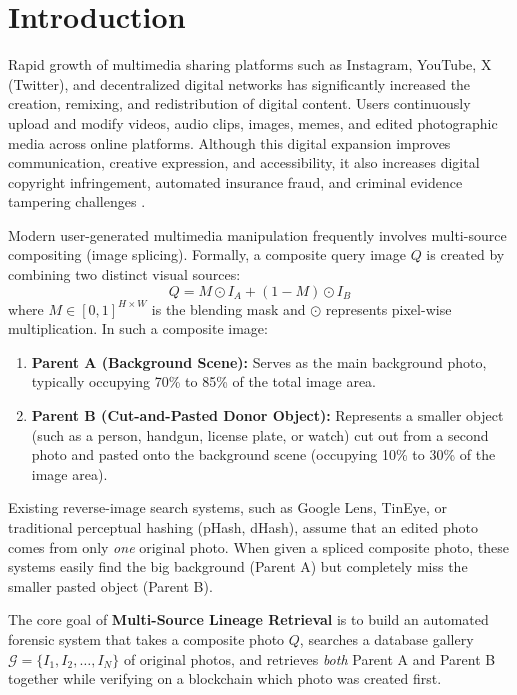\documentclass[12pt,a4paper]{article}
\begin{document}
\section{Introduction}
Rapid growth of multimedia sharing platforms such as Instagram, YouTube, X (Twitter), and decentralized digital networks has significantly increased the creation, remixing, and redistribution of digital content. Users continuously upload and modify videos, audio clips, images, memes, and edited photographic media across online platforms. Although this digital expansion improves communication, creative expression, and accessibility, it also increases digital copyright infringement, automated insurance fraud, and criminal evidence tampering challenges \cite{sscd, trufor}.

Modern user-generated multimedia manipulation frequently involves multi-source compositing (image splicing). Formally, a composite query image $Q$ is created by combining two distinct visual sources:
\begin{equation}
Q = M \odot I_A + (1 - M) \odot I_B
\end{equation}
where $M \in [0, 1]^{H \times W}$ is the blending mask and $\odot$ represents pixel-wise multiplication. In such a composite image:
\begin{enumerate}
    \item \textbf{Parent A (Background Scene):} Serves as the main background photo, typically occupying 70\% to 85\% of the total image area.
    \item \textbf{Parent B (Cut-and-Pasted Donor Object):} Represents a smaller object (such as a person, handgun, license plate, or watch) cut out from a second photo and pasted onto the background scene (occupying 10\% to 30\% of the image area).
\end{enumerate}

Existing reverse-image search systems, such as Google Lens, TinEye, or traditional perceptual hashing (pHash, dHash), assume that an edited photo comes from only \textit{one} original photo. When given a spliced composite photo, these systems easily find the big background (Parent A) but completely miss the smaller pasted object (Parent B).

The core goal of \textbf{Multi-Source Lineage Retrieval} is to build an automated forensic system that takes a composite photo $Q$, searches a database gallery $\mathcal{G} = \{I_1, I_2, \dots, I_N\}$ of original photos, and retrieves \textit{both} Parent A and Parent B together while verifying on a blockchain which photo was created first.
\end{document}
